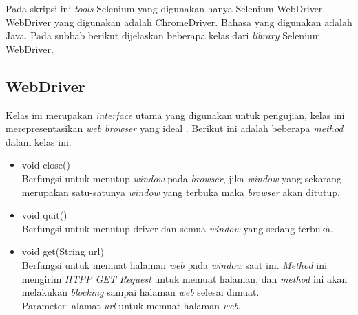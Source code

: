 Pada skripsi ini \textit{tools} Selenium yang digunakan hanya Selenium WebDriver. WebDriver yang digunakan adalah ChromeDriver. Bahasa yang digunakan adalah Java. Pada subbab berikut dijelaskan beberapa kelas dari \textit{library} Selenium WebDriver. 
\cite{Selenium_java_doc}
\subsection{WebDriver}
\label{subsec:webdriver}
Kelas ini merupakan \textit{interface} utama yang digunakan untuk pengujian, kelas ini merepresentasikan \textit{web browser} yang ideal \cite{Selenium_java_doc}. Berikut ini adalah beberapa \textit{method} dalam kelas ini:
\begin{itemize}
\item void close()\\
Berfungsi untuk menutup \textit{window} pada \textit{browser}, jika \textit{window} yang sekarang merupakan satu-satunya \textit{window} yang terbuka maka \textit{browser} akan ditutup.
\item void quit()\\
Berfungsi untuk menutup driver dan semua \textit{window} yang sedang terbuka.
\item void get(String url)\\
Berfungsi untuk memuat halaman \textit{web} pada \textit{window} saat ini. \textit{Method} ini mengirim \textit{HTPP GET Request} untuk memuat halaman, dan \textit{method} ini akan melakukan \textit{blocking} sampai halaman \textit{web} selesai dimuat.\\
Parameter: alamat \textit{url} untuk memuat halaman \textit{web}.
\end{itemize}

